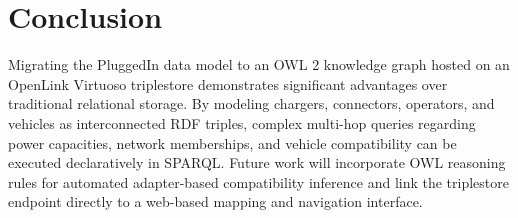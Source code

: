 \documentclass[sigconf]{acmart}
\begin{document}
\section{Conclusion}
Migrating the PluggedIn data model to an OWL 2 knowledge graph hosted on an OpenLink Virtuoso triplestore demonstrates significant advantages over traditional relational storage. By modeling chargers, connectors, operators, and vehicles as interconnected RDF triples, complex multi-hop queries regarding power capacities, network memberships, and vehicle compatibility can be executed declaratively in SPARQL. Future work will incorporate OWL reasoning rules for automated adapter-based compatibility inference and link the triplestore endpoint directly to a web-based mapping and navigation interface.



\end{document}
